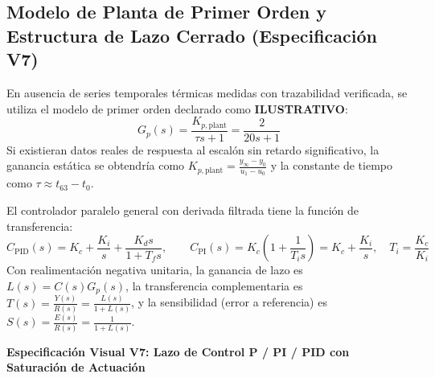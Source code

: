 \documentclass[11pt, a4paper]{article}
\begin{document}
\subsection{Modelo de Planta de Primer Orden y Estructura de Lazo Cerrado (Especificación V7)}
En ausencia de series temporales térmicas medidas con trazabilidad verificada, se utiliza el modelo de primer orden declarado como \textbf{ILUSTRATIVO}:
\begin{equation}
    G_p(s) = \frac{K_{p,\text{plant}}}{\tau s + 1} = \frac{2}{20s + 1}
\end{equation}
Si existieran datos reales de respuesta al escalón sin retardo significativo, la ganancia estática se obtendría como $K_{p,\text{plant}} = \frac{y_\infty - y_0}{u_1 - u_0}$ y la constante de tiempo como $\tau \approx t_{63} - t_0$.

El controlador paralelo general con derivada filtrada tiene la función de transferencia:
\begin{equation}
    C_{\text{PID}}(s) = K_c + \frac{K_i}{s} + \frac{K_d s}{1 + T_f s}, \qquad C_{\text{PI}}(s) = K_c\left(1 + \frac{1}{T_i s}\right) = K_c + \frac{K_i}{s}, \quad T_i = \frac{K_c}{K_i}
\end{equation}
Con realimentación negativa unitaria, la ganancia de lazo es $L(s) = C(s)G_p(s)$, la transferencia complementaria es $T(s) = \frac{Y(s)}{R(s)} = \frac{L(s)}{1 + L(s)}$, y la sensibilidad (error a referencia) es $S(s) = \frac{E(s)}{R(s)} = \frac{1}{1 + L(s)}$.

\begin{center}
    \textbf{Especificación Visual V7: Lazo de Control P / PI / PID con Saturación de Actuación}
    \par\vspace{0.2cm}
\end{center}
\end{document}
